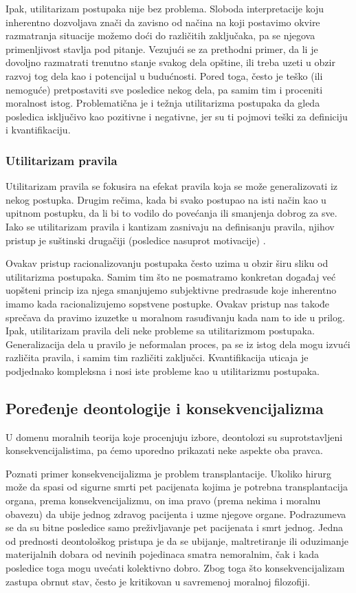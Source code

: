 \documentclass[a4paper]{article}
\begin{document}
Ipak, utilitarizam postupaka nije bez problema. Sloboda interpretacije koju inherentno dozvoljava znači da zavisno od načina na koji postavimo okvire razmatranja situacije možemo doći do različitih zaključaka, pa se njegova primenljivost stavlja pod pitanje. Vezujući se za prethodni primer, da li je dovoljno razmatrati trenutno stanje svakog dela opštine, ili treba uzeti u obzir razvoj tog dela kao i potencijal u budućnosti. Pored toga, često je teško (ili nemoguće) pretpostaviti sve posledice nekog dela, pa samim tim i proceniti moralnost istog. Problematična je i težnja utilitarizma postupaka da gleda posledica isključivo kao pozitivne i negativne, jer su ti pojmovi teški za definiciju i kvantifikaciju. 

\subsubsection{Utilitarizam pravila}
Utilitarizam pravila se fokusira na efekat pravila koja se može generalizovati iz nekog postupka. Drugim rečima, kada bi svako postupao na isti način kao u upitnom postupku, da li bi to vodilo do povećanja ili smanjenja dobrog za sve. Iako se utilitarizam pravila i kantizam zasnivaju na definisanju pravila, njihov pristup je suštinski drugačiji (posledice nasuprot motivacije) \cite{quinn-ethics}. 

Ovakav pristup racionalizovanju postupaka često uzima u obzir širu sliku od utilitarizma postupaka. Samim tim što ne posmatramo konkretan događaj već uopšteni princip iza njega smanjujemo subjektivne predrasude koje inherentno imamo kada racionalizujemo sopstvene postupke. Ovakav pristup nas takođe sprečava da pravimo izuzetke u moralnom rasuđivanju kada nam to ide u prilog. 
Ipak, utilitarizam pravila deli neke probleme sa utilitarizmom postupaka. Generalizacija dela u pravilo je neformalan proces, pa se iz istog dela mogu izvući različita pravila, i samim tim različiti zaključci. Kvantifikacija uticaja je podjednako kompleksna i nosi iste probleme kao u utilitarizmu postupaka. 

\subsection{Poređenje deontologije i konsekvencijalizma}
U domenu moralnih teorija koje procenjuju izbore, deontolozi su suprotstavljeni konsekvencijalistima, pa ćemo uporedno prikazati neke aspekte oba pravca.

Poznati primer konsekvencijalizma je problem transplantacije. Ukoliko hirurg može da spasi od sigurne smrti pet pacijenata kojima je potrebna transplantacija organa, prema konsekvencijalizmu, on ima pravo (prema nekima i moralnu obavezu) da ubije jednog zdravog pacijenta i uzme njegove organe. Podrazumeva se da su bitne posledice samo preživljavanje pet pacijenata i smrt jednog.
Jedna od prednosti deontološkog pristupa je da se ubijanje, maltretiranje ili oduzimanje materijalnih dobara od nevinih pojedinaca smatra nemoralnim, čak i kada posledice toga mogu uvećati kolektivno dobro. Zbog toga što konsekvencijalizam zastupa obrnut stav, često je kritikovan u savremenoj moralnoj filozofiji.
\end{document}
